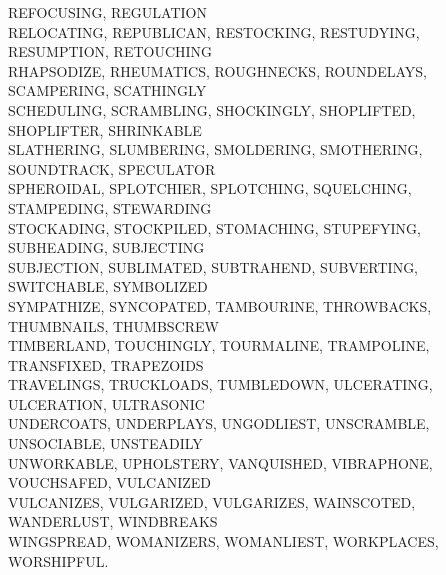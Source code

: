 REFOCUSING, REGULATION\\RELOCATING, REPUBLICAN, RESTOCKING, RESTUDYING, RESUMPTION, RETOUCHING\\RHAPSODIZE, RHEUMATICS, ROUGHNECKS, ROUNDELAYS, SCAMPERING, SCATHINGLY\\SCHEDULING, SCRAMBLING, SHOCKINGLY, SHOPLIFTED, SHOPLIFTER, SHRINKABLE\\SLATHERING, SLUMBERING, SMOLDERING, SMOTHERING, SOUNDTRACK, SPECULATOR\\SPHEROIDAL, SPLOTCHIER, SPLOTCHING, SQUELCHING, STAMPEDING, STEWARDING\\STOCKADING, STOCKPILED, STOMACHING, STUPEFYING, SUBHEADING, SUBJECTING\\SUBJECTION, SUBLIMATED, SUBTRAHEND, SUBVERTING, SWITCHABLE, SYMBOLIZED\\SYMPATHIZE, SYNCOPATED, TAMBOURINE, THROWBACKS, THUMBNAILS, THUMBSCREW\\TIMBERLAND, TOUCHINGLY, TOURMALINE, TRAMPOLINE, TRANSFIXED, TRAPEZOIDS\\TRAVELINGS, TRUCKLOADS, TUMBLEDOWN, ULCERATING, ULCERATION, ULTRASONIC\\UNDERCOATS, UNDERPLAYS, UNGODLIEST, UNSCRAMBLE, UNSOCIABLE, UNSTEADILY\\UNWORKABLE, UPHOLSTERY, VANQUISHED, VIBRAPHONE, VOUCHSAFED, VULCANIZED\\VULCANIZES, VULGARIZED, VULGARIZES, WAINSCOTED, WANDERLUST, WINDBREAKS\\WINGSPREAD, WOMANIZERS, WOMANLIEST, WORKPLACES, WORSHIPFUL.